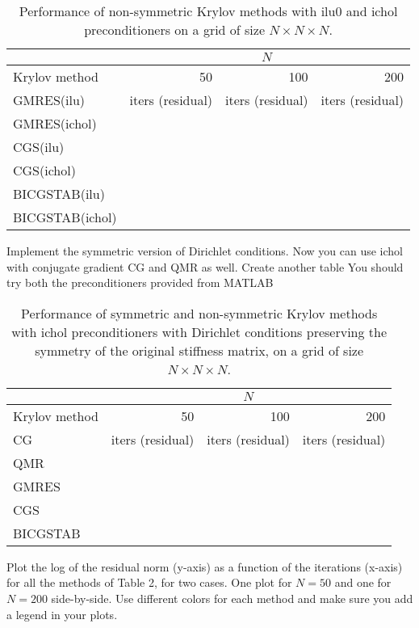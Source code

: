 \documentclass[unicode,11pt,a4paper,oneside,numbers=endperiod,openany]{scrartcl}
\begin{document}
\begin{table}[h]
\centering
\begin{tabular}{|l|r|r|r|}
\hline
                  &  \multicolumn{3}{|c|}{$N$} \\
\hline
 Krylov method    & 50  & 100 & 200 \\
\hline
GMRES(ilu)        & iters (residual)    &  iters (residual)   &  iters (residual)\\
GMRES(ichol)      &     &     &  \\
\hline
CGS(ilu)          &     &     &  \\
CGS(ichol)        &     &     &  \\
\hline
BICGSTAB(ilu)     &     &     &  \\
BICGSTAB(ichol)   &     &     &  \\
\hline
\end{tabular}
\caption{Performance of non-symmetric Krylov methods with ilu0 and ichol preconditioners on a grid of size $N \times N \times N$.}
\end{table}
Implement the symmetric version of Dirichlet conditions. Now you can use ichol
with conjugate gradient CG and QMR as well. Create another table 
You should try both the preconditioners provided from MATLAB 
\begin{table}[h]
\centering
\begin{tabular}{|l|r|r|r|}
\hline
                  &  \multicolumn{3}{|c|}{$N$} \\
\hline
 Krylov method    & 50  & 100 & 200 \\
\hline
CG                &  iters (residual)   &  iters (residual)   &  iters (residual)\\
\hline
QMR               &     &     &  \\
\hline
GMRES             &     &     &  \\
\hline
CGS               &     &     &  \\
\hline
BICGSTAB          &     &     &  \\
\hline
\end{tabular}
\caption{Performance of symmetric and non-symmetric Krylov methods with ichol 
         preconditioners with Dirichlet conditions preserving the symmetry of 
         the original stiffness matrix, on a grid of size $N \times N \times N$.}
\end{table}
Plot the log of the residual norm (y-axis) as a function of the iterations (x-axis)
for all the methods of Table 2, for two cases. One plot for $N=50$ and one for $N=200$ side-by-side.
Use different colors for each method and make sure you add a legend in your plots. 
\end{document}
